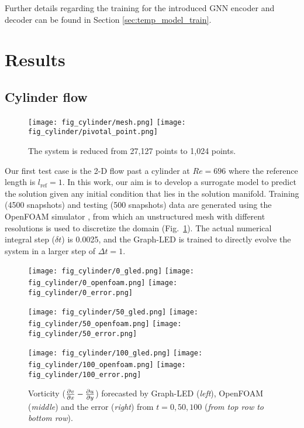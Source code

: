 \documentclass{article}
\begin{document}
Further details regarding the training for the introduced GNN encoder and decoder can be found in Section \ref{sec:temp_model_train}.


 

\section{Results}
\subsection{Cylinder flow}
\begin{figure}[htp]
    \centering
    \texttt{[image: fig\_cylinder/mesh.png]}
    \texttt{[image: fig\_cylinder/pivotal\_point.png]}
    \caption{The system is reduced from 27,127 points to 1,024 points.}
    \label{fig:fpc-mesh}
\end{figure}
Our first test case is the 2-D flow past a cylinder at $Re = 696$ where the reference length is $l_\mathrm{ref}=1$. In this work, our aim is to develop a surrogate model to predict the solution given any initial condition that lies in the solution manifold. Training (4500 snapshots) and testing (500 snapshots) data are generated using the OpenFOAM simulator \cite{jasak2007openfoam}, from which an unstructured mesh with different resolutions is used to discretize the domain (Fig.~\ref{fig:fpc-mesh}). The actual numerical integral step ($\delta t$) is 0.0025, and the Graph-LED is trained to directly evolve the system in a larger step of $\Delta t = 1$. 
\begin{figure}[htp]
    \centering
    \texttt{[image: fig\_cylinder/0\_gled.png]}
    \texttt{[image: fig\_cylinder/0\_openfoam.png]}
    \texttt{[image: fig\_cylinder/0\_error.png]}

    \texttt{[image: fig\_cylinder/50\_gled.png]}
    \texttt{[image: fig\_cylinder/50\_openfoam.png]}
    \texttt{[image: fig\_cylinder/50\_error.png]}

    
    \texttt{[image: fig\_cylinder/100\_gled.png]}
    \texttt{[image: fig\_cylinder/100\_openfoam.png]}
    \texttt{[image: fig\_cylinder/100\_error.png]}
    \caption{Vorticity ($\frac{\partial v}{\partial x} - \frac{\partial u}{\partial y}$) forecasted by Graph-LED (\textit{left}), OpenFOAM (\textit{middle}) and the error (\textit{right}) from $t = 0, 50, 100$ (\textit{from top row to bottom row}). }
    \label{fig:fpc-vor}
\end{figure}
\end{document}
